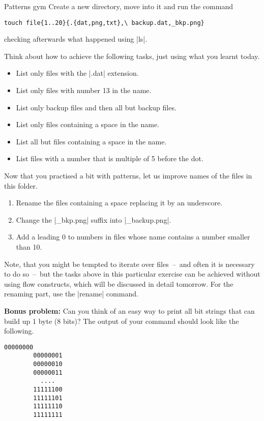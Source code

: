 
\begin{exercise}[Inspirational]{Patterns gym}
    Create a new directory, move into it and run the command
    \begin{lstlisting}[style=MyBash]
        touch file{1..20}{.{dat,png,txt},\ backup.dat,_bkp.png}
    \end{lstlisting}
    checking afterwards what happened using \bash|ls|.

    Think about how to achieve the following tasks, just using what you learnt today.
    \begin{itemize}
        \item List only files with the \bash|.dat| extension.
        \item List only files with number 13 in the name.
        \item List only backup files and then all but backup files.
        \item List only files containing a space in the name.
        \item List all but files containing a space in the name.
        \item List files with a number that is multiple of 5 before the dot.
    \end{itemize}

    Now that you practised a bit with patterns, let us improve names of the files in this folder.
    \begin{enumerate}
        \item Rename the files containing a space replacing it by an underscore.
        \item Change the \bash|_bkp.png| suffix into \bash|_backup.png|.
        \item Add a leading 0 to numbers in files whose name contains a number smaller than 10.
    \end{enumerate}

    Note, that you might be tempted to iterate over files~--~and often it is necessary to do so~--~but the tasks above in this particular exercise can be achieved without using flow constructs, which will be discussed in detail tomorrow.
    For the renaming part, use the \bash|rename| command.

    \vspace{5mm}
    \textbf{Bonus problem:} Can you think of an easy way to print all bit strings that can build up 1 byte (8 bits)?
    The output of your command should look like the following.
    \begin{lstlisting}[style=MyBash]
        00000000
        00000001
        00000010
        00000011
          ....
        11111100
        11111101
        11111110
        11111111
    \end{lstlisting}
\end{exercise}